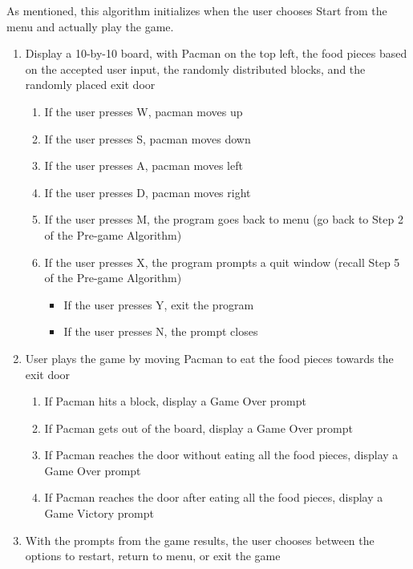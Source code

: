 As mentioned, this algorithm initializes when the user chooses Start from the menu and actually play the game.

\begin{enumerate}
    \item Display a 10-by-10 board, with Pacman on the top left, the food
        pieces based on the accepted user input, the randomly distributed
        blocks, and the randomly placed exit door
        \begin{enumerate}[label=\alph*]
            \item If the user presses W, pacman moves up
            \item If the user presses S, pacman moves down
            \item If the user presses A, pacman moves left
            \item If the user presses D, pacman moves right
            \item If the user presses M, the program goes back to menu (go back to Step 2 of the Pre-game Algorithm)
            \item If the user presses X, the program prompts a quit window (recall Step 5 of the Pre-game Algorithm)
            \begin{itemize}[label={}]
                \item If the user presses Y, exit the program
                \item If the user presses N, the prompt closes
            \end{itemize}
        \end{enumerate}
    \item User plays the game by moving Pacman to eat the food pieces towards the exit door
        \begin{enumerate}[label=\alph*]
            \item If Pacman hits a block, display a Game Over prompt
            \item If Pacman gets out of the board, display a Game Over prompt
            \item If Pacman reaches the door without eating all the food pieces, display a Game Over prompt
            \item If Pacman reaches the door after eating all the food pieces, display a Game Victory prompt
        \end{enumerate}
    \item With the prompts from the game results, the user chooses between the options to restart, return to menu, or exit the game

\end{enumerate}
